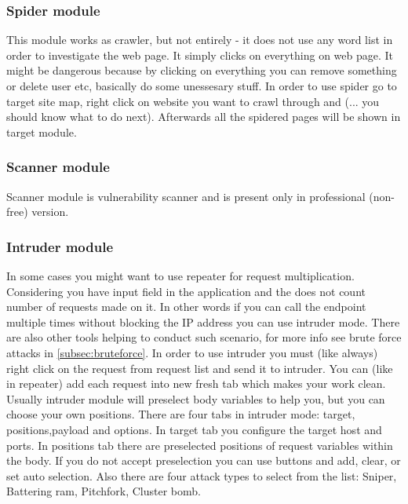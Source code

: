 \documentclass{article}[12pt]
\begin{document}
\subsubsection{Spider module}
This module works as crawler, but not entirely - it does not use any word list in order to investigate the web page.
It simply clicks on everything on web page.
It might be dangerous because by clicking on everything you can remove something or delete user etc, basically do some unessesary stuff.
In order to use spider go to target site map, right click on website you want to crawl through and (... you should know what to do next).
Afterwards all the spidered pages will be shown in target module.


\subsubsection{Scanner module}

Scanner module is vulnerability scanner and is present only in professional (non-free) version.

\subsubsection{Intruder module}

In some cases you might want to use repeater for request multiplication.
Considering you have input field in the application and the does not count number of requests made on it.
In other words if you can call the endpoint multiple times without blocking the IP address you can use intruder mode.
There are also other tools helping to conduct such scenario, for more info see brute force attacks in \ref{subsec:bruteforce}.\newline \newline
In order to use intruder you must (like always) right click on the request from request list and send it to intruder.
You can (like in repeater) add each request into new fresh tab which makes your work clean.
Usually intruder module will preselect body variables to help you, but you can choose your own positions.
There are four tabs in intruder mode: target, positions,payload and options.
In target tab you configure the target host and ports.
In positions tab there are preselected positions of request variables within the body.
If you do not accept preselection you can use buttons and add, clear, or set auto selection.
Also there are four attack types to select from the list: Sniper, Battering ram, Pitchfork, Cluster bomb.
\end{document}
